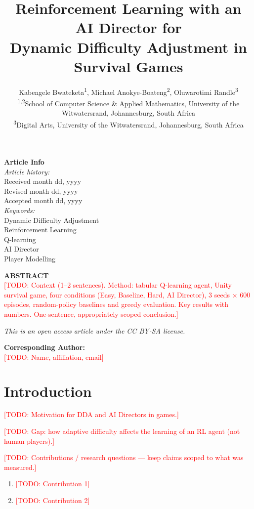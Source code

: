 \documentclass[10pt,a4paper]{article}
\title{\bfseries Reinforcement Learning with an AI Director for\\ Dynamic Difficulty Adjustment in Survival Games}
\author{
Kabengele Bwateketa\textsuperscript{1}, Michael Anokye-Boateng\textsuperscript{2}, Oluwarotimi Randle\textsuperscript{3}\\[4pt]
\small \textsuperscript{1,2}School of Computer Science \& Applied Mathematics, University of the Witwatersrand, Johannesburg, South Africa\\
\small \textsuperscript{3}Digital Arts, University of the Witwatersrand, Johannesburg, South Africa
}
\date{}
\newcommand{\todo}[1]{\textcolor{red}{[TODO: #1]}}
\begin{document}
\maketitle

\noindent
\begin{minipage}[t]{0.28\textwidth}
\small
\textbf{Article Info}\\[4pt]
\textit{Article history:}\\
Received month dd, yyyy\\
Revised month dd, yyyy\\
Accepted month dd, yyyy\\[6pt]
\textit{Keywords:}\\
Dynamic Difficulty Adjustment\\
Reinforcement Learning\\
Q-learning\\
AI Director\\
Player Modelling
\end{minipage}\hfill
\begin{minipage}[t]{0.68\textwidth}
\small
\textbf{ABSTRACT}\\[4pt]
\todo{Context (1--2 sentences). Method: tabular Q-learning agent, Unity survival game,
four conditions (Easy, Baseline, Hard, AI Director), 3 seeds $\times$ 600 episodes,
random-policy baselines and greedy evaluation. Key results with numbers. One-sentence,
appropriately scoped conclusion.}
\end{minipage}

\vspace{6pt}
\noindent\small\textit{This is an open access article under the CC BY-SA license.}
\normalsize

\vspace{6pt}
\noindent\textbf{Corresponding Author:}\\
\todo{Name, affiliation, email}

\section{Introduction}
\todo{Motivation for DDA and AI Directors in games.}

\todo{Gap: how adaptive difficulty affects the learning of an RL agent (not human players).}

\todo{Contributions / research questions --- keep claims scoped to what was measured.}
\begin{enumerate}[label=(\roman*)]
    \item \todo{Contribution 1}
    \item \todo{Contribution 2}
\end{enumerate}
\end{document}
